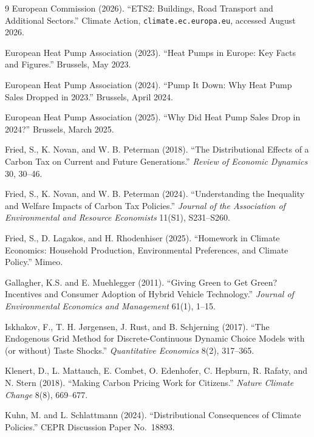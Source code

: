 \begin{thebibliography}{9}
European Commission (2026).
``ETS2: Buildings, Road Transport and Additional Sectors.''
Climate Action, \texttt{climate.ec.europa.eu}, accessed August 2026.

European Heat Pump Association (2023).
``Heat Pumps in Europe: Key Facts and Figures.'' Brussels, May 2023.

European Heat Pump Association (2024).
``Pump It Down: Why Heat Pump Sales Dropped in 2023.'' Brussels, April 2024.

European Heat Pump Association (2025).
``Why Did Heat Pump Sales Drop in 2024?'' Brussels, March 2025.

Fried, S., K. Novan, and W. B. Peterman (2018).
``The Distributional Effects of a Carbon Tax on Current and Future Generations.''
\emph{Review of Economic Dynamics} 30, 30--46.

Fried, S., K. Novan, and W. B. Peterman (2024).
``Understanding the Inequality and Welfare Impacts of Carbon Tax Policies.''
\emph{Journal of the Association of Environmental and Resource Economists} 11(S1), S231--S260.

Fried, S., D. Lagakos, and H. Rhodenhiser (2025).
``Homework in Climate Economics: Household Production, Environmental Preferences,
and Climate Policy.'' Mimeo.

Gallagher, K.S. and E. Muehlegger (2011).
``Giving Green to Get Green? Incentives and Consumer Adoption of Hybrid Vehicle Technology.''
\emph{Journal of Environmental Economics and Management} 61(1), 1--15.

Iskhakov, F., T. H. J{\o}rgensen, J. Rust, and B. Schjerning (2017).
``The Endogenous Grid Method for Discrete-Continuous Dynamic Choice Models with
(or without) Taste Shocks.'' \emph{Quantitative Economics} 8(2), 317--365.

Klenert, D., L. Mattauch, E. Combet, O. Edenhofer, C. Hepburn, R. Rafaty, and N. Stern (2018).
``Making Carbon Pricing Work for Citizens.'' \emph{Nature Climate Change} 8(8), 669--677.

Kuhn, M. and L. Schlattmann (2024).
``Distributional Consequences of Climate Policies.'' CEPR Discussion Paper No.\ 18893.


\end{thebibliography}
